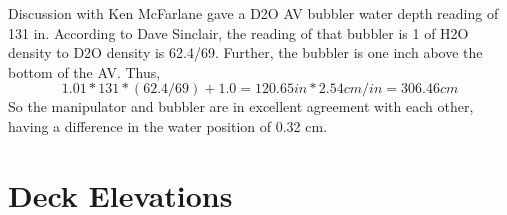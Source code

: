     Discussion with Ken McFarlane gave a D2O AV bubbler water depth
reading of 131 in.  According to Dave Sinclair, the reading of that 
bubbler is 1%
of H2O density to D2O density is 62.4/69.  Further, the bubbler is
one inch above the bottom of the AV.  Thus,
\[  
  1.01 * 131 * (62.4/69) + 1.0 = 120.65 in  * 2.54 cm/in = 306.46 cm
\]  
So the manipulator and bubbler are in excellent agreement with each other,
having a difference in the water position of 0.32 cm.


  


\chapter{Deck Elevations}
